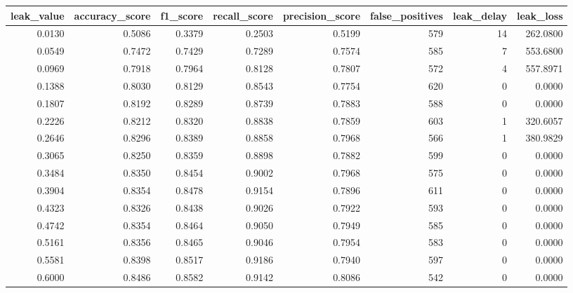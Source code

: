 \begin{tabular}{rrrrrrrr}
\toprule
leak\_value & accuracy\_score & f1\_score & recall\_score & precision\_score & false\_positives & leak\_delay & leak\_loss \\
\midrule
0.0130 & 0.5086 & 0.3379 & 0.2503 & 0.5199 & 579 & 14 & 262.0800 \\
0.0549 & 0.7472 & 0.7429 & 0.7289 & 0.7574 & 585 & 7 & 553.6800 \\
0.0969 & 0.7918 & 0.7964 & 0.8128 & 0.7807 & 572 & 4 & 557.8971 \\
0.1388 & 0.8030 & 0.8129 & 0.8543 & 0.7754 & 620 & 0 & 0.0000 \\
0.1807 & 0.8192 & 0.8289 & 0.8739 & 0.7883 & 588 & 0 & 0.0000 \\
0.2226 & 0.8212 & 0.8320 & 0.8838 & 0.7859 & 603 & 1 & 320.6057 \\
0.2646 & 0.8296 & 0.8389 & 0.8858 & 0.7968 & 566 & 1 & 380.9829 \\
0.3065 & 0.8250 & 0.8359 & 0.8898 & 0.7882 & 599 & 0 & 0.0000 \\
0.3484 & 0.8350 & 0.8454 & 0.9002 & 0.7968 & 575 & 0 & 0.0000 \\
0.3904 & 0.8354 & 0.8478 & 0.9154 & 0.7896 & 611 & 0 & 0.0000 \\
0.4323 & 0.8326 & 0.8438 & 0.9026 & 0.7922 & 593 & 0 & 0.0000 \\
0.4742 & 0.8354 & 0.8464 & 0.9050 & 0.7949 & 585 & 0 & 0.0000 \\
0.5161 & 0.8356 & 0.8465 & 0.9046 & 0.7954 & 583 & 0 & 0.0000 \\
0.5581 & 0.8398 & 0.8517 & 0.9186 & 0.7940 & 597 & 0 & 0.0000 \\
0.6000 & 0.8486 & 0.8582 & 0.9142 & 0.8086 & 542 & 0 & 0.0000 \\
\bottomrule
\end{tabular}
